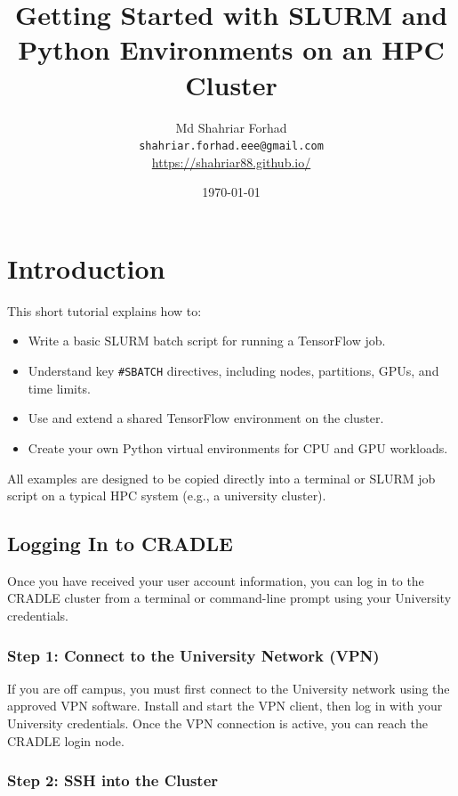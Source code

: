 \documentclass[11pt]{article}
\title{Getting Started with SLURM\index{SLURM} and Python Environments on an HPC Cluster\index{HPC cluster}}
\author{%
Md Shahriar Forhad\\
\texttt{shahriar.forhad.eee@gmail.com}\\
\url{https://shahriar88.github.io/}\\[0.6em]
\qrcode[height=1.2in]{https://shahriar88.github.io}
}
\date{\today}
\begin{document}
\maketitle

\tableofcontents
\newpage

\section{Introduction}

This short tutorial explains how to:
\begin{itemize}
  \item Write a basic SLURM batch script for running a TensorFlow job.
  \item Understand key \texttt{\#SBATCH} directives, including nodes, partitions, GPUs, and time limits.
  \item Use and extend a shared TensorFlow environment on the cluster.
  \item Create your own Python virtual environments for CPU and GPU workloads.
\end{itemize}

All examples are designed to be copied directly into a terminal or SLURM job script on a typical HPC system (e.g., a university cluster).

\subsection{Logging In to CRADLE}
\label{sec:login-cradle}

Once you have received your user account information, you can log in to the
CRADLE cluster from a terminal or command-line prompt using your
University credentials.

\subsubsection*{Step 1: Connect to the University Network (VPN)}

If you are off campus, you must first connect to the University network using the
approved VPN software. Install and start the VPN client, then log in
with your University credentials. Once the VPN connection is active, you can reach
the CRADLE login node.

\subsubsection*{Step 2: SSH into the Cluster}
\end{document}
